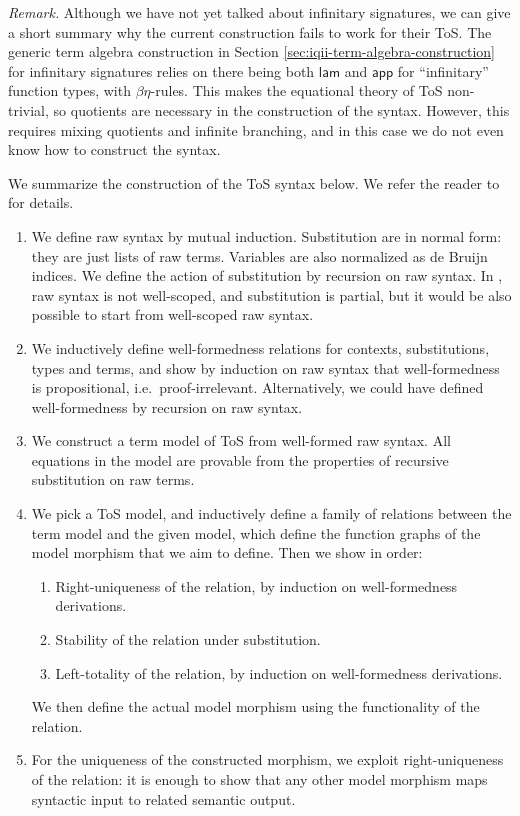 \documentclass[12pt,a4paper,twoside,openany]{book}
\theoremstyle{remark}
\theoremstyle{definition}
\theoremstyle{theorem}
\newcommand{\ms}[1]{\mathsf{#1}}
\newcommand{\app}{\ms{app}}
\newcommand{\lam}{\ms{lam}}
\begin{document}
\emph{Remark.} Although we have not yet talked about infinitary signatures, we
can give a short summary why the current construction fails to work for their
ToS.  The generic term algebra construction in Section
\ref{sec:iqii-term-algebra-construction} for infinitary signatures relies on
there being both $\lam$ and $\app$ for ``infinitary'' function types, with
$\beta\eta$-rules. This makes the equational theory of ToS non-trivial, so
quotients are necessary in the construction of the syntax. However, this
requires mixing quotients and infinite branching, and in this case we do not
even know how to construct the syntax.

We summarize the construction of the ToS syntax below. We refer the reader to
\cite{ind-ind-reduction} for details.

\begin{enumerate}
\item We define raw syntax by mutual induction. Substitution are in normal form:
      they are just lists of raw terms. Variables are also normalized as de Bruijn indices.
      We define the action of substitution by recursion on raw syntax. In \cite{ind-ind-reduction},
      raw syntax is not well-scoped, and substitution is partial, but it would be also possible
      to start from well-scoped raw syntax.
\item We inductively define well-formedness relations for contexts,
      substitutions, types and terms, and show by induction on raw syntax that
      well-formedness is propositional, i.e.\ proof-irrelevant. Alternatively, we
      could have defined well-formedness by recursion on raw syntax.
\item We construct a term model of ToS from well-formed raw syntax. All equations in the model
      are provable from the properties of recursive substitution on raw terms.
\item We pick a ToS model, and inductively define a family of relations between
      the term model and the given model, which define the function graphs of the
      model morphism that we aim to define. Then we show in order:
      \begin{enumerate}
        \item Right-uniqueness of the relation, by induction on well-formedness derivations.
        \item Stability of the relation under substitution.
        \item Left-totality of the relation, by induction on well-formedness derivations.
      \end{enumerate}
      We then define the actual model morphism using the functionality of the relation.
\item For the uniqueness of the constructed morphism, we exploit
      right-uniqueness of the relation: it is enough to show that any other model
      morphism maps syntactic input to related semantic output.
\end{enumerate}
\end{document}
